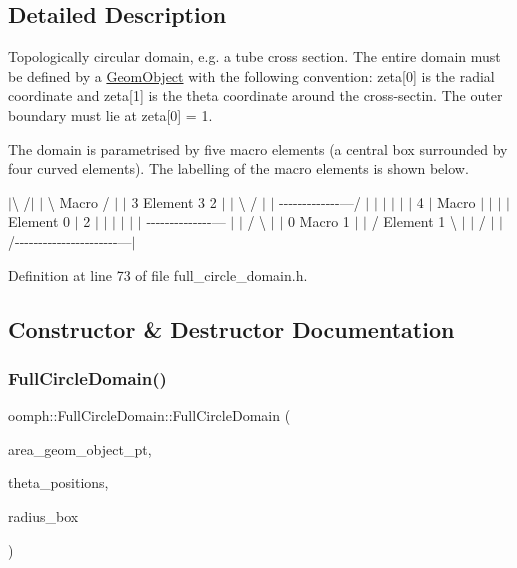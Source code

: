 \subsection{Detailed Description}
Topologically circular domain, e.\+g. a tube cross section. The entire domain must be defined by a \hyperlink{classoomph_1_1GeomObject}{Geom\+Object} with the following convention\+: zeta\mbox{[}0\mbox{]} is the radial coordinate and zeta\mbox{[}1\mbox{]} is the theta coordinate around the cross-\/sectin. The outer boundary must lie at zeta\mbox{[}0\mbox{]} = 1. 

The domain is parametrised by five macro elements (a central box surrounded by four curved elements). The labelling of the macro elements is shown below. 

 $\vert$\textbackslash{} /$\vert$ $\vert$ \textbackslash{} Macro / $\vert$ $\vert$ 3 Element 3 2 $\vert$ $\vert$ \textbackslash{} / $\vert$ $\vert$ -\/-\/-\/-\/-\/-\/-\/-\/-\/-\/-\/-\/-\/---/ $\vert$ $\vert$ $\vert$ $\vert$ $\vert$ $\vert$ 4 $\vert$ Macro $\vert$ $\vert$ $\vert$ $\vert$ Element 0 $\vert$ 2 $\vert$ $\vert$ $\vert$ $\vert$ $\vert$ $\vert$ -\/-\/-\/-\/-\/-\/-\/-\/-\/-\/-\/-\/-\/-\/--- $\vert$ $\vert$ / \textbackslash{} $\vert$ $\vert$ 0 Macro 1 $\vert$ $\vert$ / Element 1 \textbackslash{} $\vert$ $\vert$ / $|$ $\vert$/-\/-\/-\/-\/-\/-\/-\/-\/-\/-\/-\/-\/-\/-\/-\/-\/-\/-\/-\/-\/-\/-\/---$\vert$ 

Definition at line 73 of file full\+\_\+circle\+\_\+domain.\+h.



\subsection{Constructor \& Destructor Documentation}
\mbox{\label{classoomph_1_1FullCircleDomain_a35697cff7683dde517a2b8cf912a6aac}} 
\subsubsection{\texorpdfstring{Full\+Circle\+Domain()}{FullCircleDomain()}\hspace{0.1cm}{\footnotesize\ttfamily [1/2]}}
{\footnotesize\ttfamily oomph\+::\+Full\+Circle\+Domain\+::\+Full\+Circle\+Domain (\begin{DoxyParamCaption}\item[{\hyperlink{classoomph_1_1GeomObject}{Geom\+Object} $\ast$}]{area\+\_\+geom\+\_\+object\+\_\+pt,  }\item[{const \hyperlink{classoomph_1_1Vector}{Vector}$<$ double $>$ \&}]{theta\+\_\+positions,  }\item[{const \hyperlink{classoomph_1_1Vector}{Vector}$<$ double $>$ \&}]{radius\+\_\+box }\end{DoxyParamCaption})\hspace{0.3cm}{\ttfamily [inline]}}



